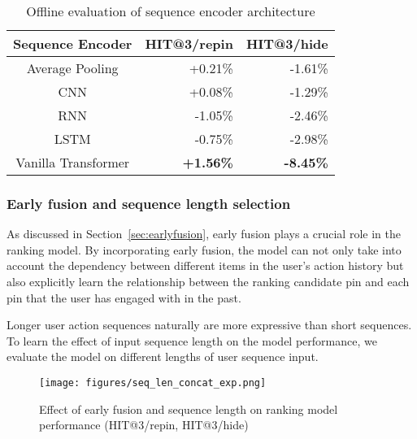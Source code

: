 \begin{table}
  \caption{Offline evaluation of sequence encoder architecture}
  \label{tab:seq_encoder}
  \begin{tabular}{crr}
    \toprule
    Sequence Encoder & HIT@3/repin & HIT@3/hide\\
    \midrule
    Average Pooling & +0.21\%& -1.61\% \\
    CNN & +0.08\% & -1.29\% \\
    RNN & -1.05\% & -2.46\% \\
    LSTM & -0.75\% & -2.98\% \\
    Vanilla Transformer & \textbf{+1.56\%} & \textbf{-8.45\%} \\
  \bottomrule
\end{tabular}
\end{table}



\subsubsection{Early fusion and sequence length selection}

As discussed in Section~\ref{sec:earlyfusion}, early fusion plays a crucial role in the ranking model.  
By incorporating early fusion, the model can not only take into account the dependency between different items in the user's action history but also explicitly learn the relationship between the ranking candidate pin and each pin that the user has engaged with in the past.


Longer user action sequences naturally are more expressive than short sequences. 
To learn the effect of input sequence length on the model performance, we evaluate the model on different lengths of user sequence input.

\begin{figure}[h]
  \centering
  \texttt{[image: figures/seq\_len\_concat\_exp.png]}
  \caption{Effect of early fusion and sequence length on ranking model performance (HIT@3/repin, HIT@3/hide) }
  \label{fig:seq_len}
\end{figure}


